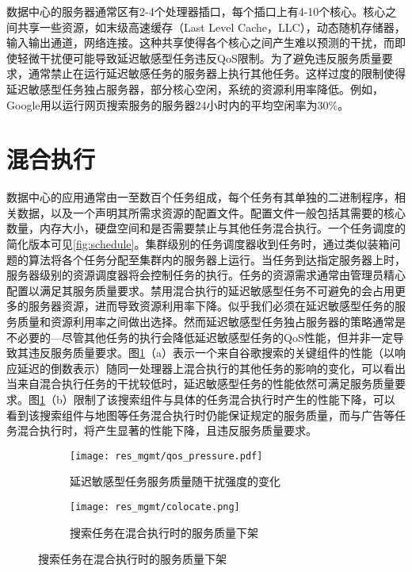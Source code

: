 数据中心的服务器通常区有2-4个处理器插口，每个插口上有4-10个核心。核心之间共享一些资源，如末级高速缓存（Last Level Cache，LLC），动态随机存储器，输入输出通道，网络连接。这种共享使得各个核心之间产生难以预测的干扰，而即使轻微干扰便可能导致延迟敏感型任务违反QoS限制\cite{janapa2010web}\cite{nesbit2006fair}\cite{meisner2011power}。为了避免违反服务质量要求，通常禁止在运行延迟敏感任务的服务器上执行其他任务。这样过度的限制使得延迟敏感型任务独占服务器，部分核心空闲，系统的资源利用率降低。例如，Google用以运行网页搜索服务的服务器24小时内的平均空闲率为30\%\cite{lo2014towards}。

\section{混合执行}
数据中心的应用通常由一至数百个任务组成，每个任务有其单独的二进制程序，相关数据，以及一个声明其所需求资源的配置文件\cite{mishra2010towards}。配置文件一般包括其需要的核心数量，内存大小，硬盘空间和是否需要禁止与其他任务混合执行。一个任务调度的简化版本可见\ref{fig:schedule}。集群级别的任务调度器收到任务时，通过类似装箱问题的算法将各个任务分配至集群内的服务器上运行\cite{mishra2010towards}。当任务到达指定服务器上时，服务器级别的资源调度器将会控制任务的执行\cite{banga1999resource}。任务的资源需求通常由管理员精心配置以满足其服务质量要求。禁用混合执行的延迟敏感型任务不可避免的会占用更多的服务器资源，进而导致资源利用率下降。似乎我们必须在延迟敏感型任务的服务质量和资源利用率之间做出选择。然而延迟敏感型任务独占服务器的策略通常是不必要的---尽管其他任务的执行会降低延迟敏感型任务的QoS性能，但并非一定导致其违反服务质量要求。图\ref{fig:colocate}（a）表示一个来自谷歌搜索的关键组件的性能（以响应延迟的倒数表示）随同一处理器上混合执行的其他任务的影响的变化，可以看出当来自混合执行任务的干扰较低时，延迟敏感型任务的性能依然可满足服务质量要求\cite{mars2011bubble}。图\ref{fig:colocate}（b）限制了该搜索组件与具体的任务混合执行时产生的性能下降，可以看到该搜索组件与地图等任务混合执行时仍能保证规定的服务质量，而与广告等任务混合执行时，将产生显著的性能下降，且违反服务质量要求。

\begin{figure}
  \centering
  \begin{subfigure}{0.4\textwidth}
    \centering
    \texttt{[image: res\_mgmt/qos\_pressure.pdf]}
    \caption{延迟敏感型任务服务质量随干扰强度的变化}
  \end{subfigure}
  \hspace{1em}
  \begin{subfigure}{0.55\textwidth}
    \centering
    \texttt{[image: res\_mgmt/colocate.png]}
    \caption{搜索任务在混合执行时的服务质量下架}
  \end{subfigure}
  \label{fig:colocate}
\end{figure}

